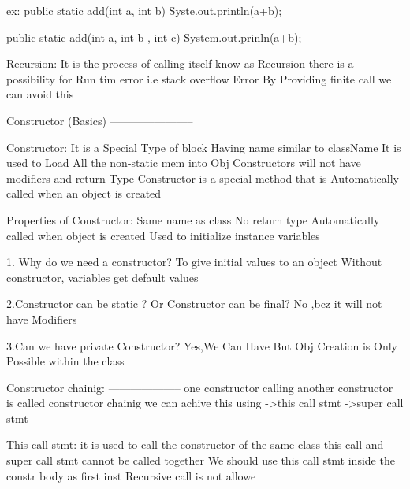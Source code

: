     ex:
       public static add(int a, int b){
         Syste.out.println(a+b);
       }

       public static add(int a, int b , int c){
         System.out.prinln(a+b);
       }
       


Recursion:
    It is the process of calling itself know as Recursion
    there is a possibility for Run tim error i.e stack overflow Error
    By Providing finite call we can avoid this


    Constructor (Basics)
    -----------------------

               Constructor:
                           It is a Special Type of block Having name similar to className
                           It is used to Load All the non-static mem into Obj
                           Constructors will not have modifiers and return Type
                           Constructor is a special method that is Automatically called when an object is created


               Properties of Constructor:
                                 Same name as class
                                 No return type
                                 Automatically called when object is created
                                 Used to initialize instance variables

              1. Why do we need a constructor?
                           To give initial values to an object
                           Without constructor, variables get default values

               2.Constructor can be static ? Or Constructor can be final?
                  No ,bcz it will not have Modifiers

               3.Can we have private Constructor?
                  Yes,We Can Have But Obj Creation is Only Possible within the class 



   Constructor chainig:
   --------------------
                     one constructor calling another constructor is called constructor chainig
                     we can achive this using
                          ->this call stmt
                          ->super call stmt

               This call stmt:
                        it is used to call the constructor of the same class
                        this call and super call stmt cannot be called together
                        We should use this call stmt inside the constr body as first inst
                        Recursive call is not allowe

